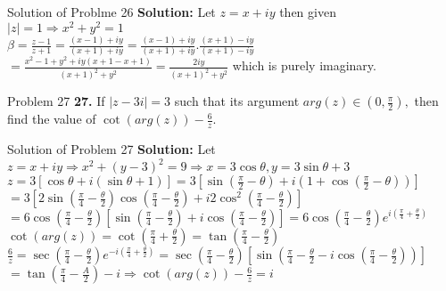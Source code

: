 \documentclass[aspectratio=169,8pt]{beamer}
\begin{document}
\begin{frame}{Solution of Problme 26}
  \textbf{Solution:} Let $z = x + iy$ then given $|z| = 1 \Rightarrow x^2 + y^2 = 1$\\
  \vspace*{0.2cm}
  $\beta = \frac{z - 1}{z + 1} = \frac{(x - 1) + iy}{(x + 1) + iy} = \frac{(x - 1) + iy}{(x + 1) + iy}.\frac{(x + 1) - iy}{(x + 1) - iy}$\\
  \vspace*{0.2cm}
  $= \frac{x^2 - 1 + y^2 + iy(x + 1 -x + 1)}{(x + 1)^2 + y^2} = \frac{2iy}{(x + 1)^2 + y^2}$ which is purely imaginary.
\end{frame}
\begin{frame}{Problem 27}
  \textbf{27.} If $|z - 3i| = 3$ such that its argument $arg(z) \in\left(0, \frac{\pi}{2}\right),$ then find the value of $\cot(arg(z)) - \frac{6}{z}.$
\end{frame}
\begin{frame}{Solution of Problem 27}
  \textbf{Solution:} Let $z = x + iy \Rightarrow x^2 + (y - 3)^2 = 9 \Rightarrow x = 3\cos\theta, y = 3\sin\theta + 3$\\
  \vspace*{0.2cm}
  $z = 3[\cos\theta + i(\sin\theta + 1)] = 3\left[\sin\left(\frac{\pi}{2} - \theta\right) + i\left(1 + \cos\left(\frac{\pi}{2} - \theta\right)\right)\right]$\\
  \vspace*{0.2cm}
  $= 3\left[2\sin\left(\frac{\pi}{4} - \frac{\theta}{2}\right)\cos\left(\frac{\pi}{4} - \frac{\theta}{2}\right) + i2\cos^2\left(\frac{\pi}{4} - \frac{\theta}{2}\right)\right]$\\
  \vspace*{0.2cm}
  $= 6\cos\left(\frac{\pi}{4} - \frac{\theta}{2}\right)\left[\sin\left(\frac{\pi}{4} - \frac{\theta}{2}\right) + i\cos\left(\frac{\pi}{4} - \frac{\theta}{2}\right)\right]
  = 6\cos\left(\frac{\pi}{4} - \frac{\theta}{2}\right)e^{i\left(\frac{\pi}{4} + \frac{\theta}{2}\right)}$\\
  \vspace*{0.2cm}
  $\cot\left(arg(z)\right) = \cot\left(\frac{\pi}{4} + \frac{\theta}{2}\right) = \tan\left(\frac{\pi}{4} - \frac{\theta}{2}\right)$\\
  \vspace*{0.2cm}
  $\frac{6}{z} = \sec\left(\frac{\pi}{4} - \frac{\theta}{2}\right)e^{-i\left(\frac{\pi}{4} + \frac{\theta}{2}\right)} = \sec\left(\frac{\pi}{4} - \frac{\theta}{2}\right)
  \left[\sin\left(\frac{\pi}{4} - \frac{\theta}{2} - i\cos\left(\frac{\pi}{4} - \frac{\theta}{2}\right)\right)\right]$\\
  \vspace*{0.2cm}
  $= \tan\left(\frac{\pi}{4} - \frac{A}{2}\right) - i \Rightarrow \cot(arg(z)) - \frac{6}{z} = i$
\end{frame}
\end{document}
